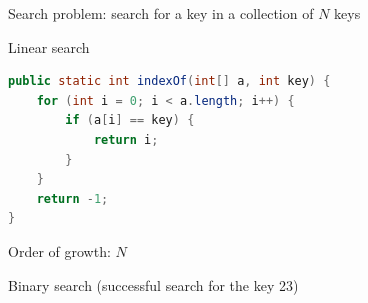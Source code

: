 \documentclass[8pt,a4paper,compress]{beamer}
\begin{document}
\begin{frame}[fragile]
\pause

Search problem: search for a key in a collection of $N$ keys

\pause\bigskip

Linear search

\smallskip

\begin{lstlisting}[language=Java,style=focusin]
public static int indexOf(int[] a, int key) {
    for (int i = 0; i < a.length; i++) {
        if (a[i] == key) { 
            return i; 
        }
    }
    return -1;
}
\end{lstlisting}

\pause\bigskip

Order of growth: $N$

\pause\bigskip

Binary search (successful search for the key 23)
\begin{center}
\end{center}
\end{frame}
\end{document}
